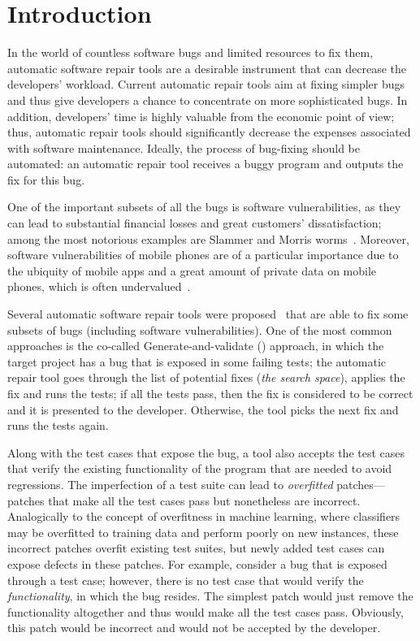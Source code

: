\section{Introduction}

In the world of countless software bugs and limited resources to fix them, automatic software repair tools are a desirable instrument that can decrease the developers' workload.
Current automatic repair tools aim at fixing simpler bugs and thus give developers a chance to concentrate on more sophisticated bugs.
In addition, developers' time is highly valuable from the economic point of view; thus, automatic repair tools should significantly decrease the expenses  associated with software maintenance.
Ideally, the process of bug-fixing should be automated: an automatic repair tool receives a buggy program and outputs the fix for this bug.

One of the important subsets of all the bugs is software vulnerabilities, as they can lead to substantial financial losses and great customers' dissatisfaction; among the most notorious examples are Slammer and Morris worms~\cite{moore2003inside, streak2003morris}.
Moreover, software vulnerabilities of mobile phones are of a particular importance due to the ubiquity of mobile apps and a great amount of private data on mobile phones, which is often undervalued~\cite{egelman2014you}.

Several automatic software repair tools were proposed~\cite{le2012systematic, long2015staged, mechtaev2016angelix} that are able to fix some subsets of bugs (including software vulnerabilities).
One of the most common approaches is the co-called Generate-and-validate (\GV) approach, in which the target project has a bug that is exposed in some failing tests; the automatic repair tool goes through the list of potential fixes (\emph{the search space}), applies the fix and runs the tests; if all the tests pass, then the fix is considered to be correct and it is presented to the developer.
Otherwise, the tool picks the next fix and runs the tests again.

Along with the test cases that expose the bug, a \GV tool also accepts the test cases that verify the existing functionality of the program that are needed to avoid regressions.
The imperfection of a test suite can lead to \emph{overfitted} patches---patches that make all the test cases pass but nonetheless are incorrect.
Analogically to the concept of overfitness in machine learning, where classifiers may be overfitted to training data and perform poorly on new instances, these incorrect patches overfit existing test suites, but newly added test cases can expose defects in these patches.
For example, consider a bug that is exposed through a test case; however, there is no test case that would verify the \emph{functionality}, in which the bug resides.
The simplest patch would just remove the functionality altogether and thus would make all the test cases pass.
Obviously, this patch would be incorrect and would not be accepted by the developer.

